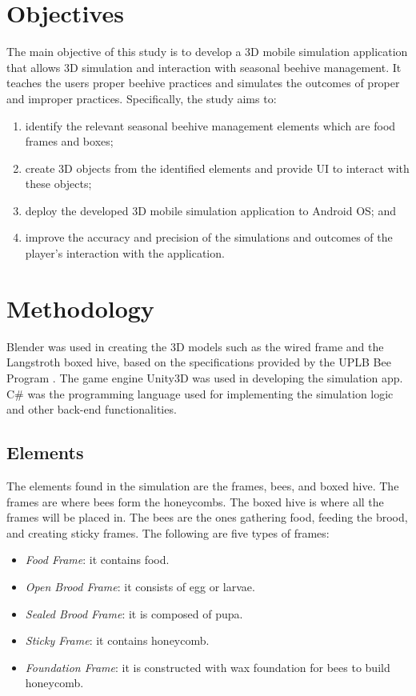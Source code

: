 \documentclass[journal]{./IEEE/IEEEtran}
\begin{document}
\section{Objectives}
The main objective of this study is to develop a 3D mobile simulation application that allows 3D simulation and interaction with seasonal beehive management. It teaches the users proper beehive practices and simulates the outcomes of proper and improper practices. Specifically, the study aims to:
\begin{enumerate}
    \item identify the relevant seasonal beehive management elements which are food frames and boxes;
    \item create 3D objects from the identified elements and provide UI to interact with these objects;
    \item deploy the developed 3D mobile simulation application to Android OS; and
    \item improve the accuracy and precision of the simulations and outcomes of the player{'}s interaction with the application.
\end{enumerate}

\section{Methodology}
\indent Blender was used in creating the 3D models such as the wired frame and the Langstroth boxed hive, based on the specifications provided by the UPLB Bee Program \cite{cervanciaetal}. The game engine Unity3D was used in developing the simulation app. C\# was the programming language used for implementing the simulation logic and other back-end functionalities.
\subsection{Elements}
\pubidadjcol
The elements found in the simulation are the frames, bees, and boxed hive. The frames are where bees form the honeycombs. The boxed hive is where all the frames will be placed in. The bees are the ones gathering food, feeding the brood, and creating sticky frames. The following are five types of frames:
\begin{itemize}
    \item \textit{Food Frame}: it contains food.
    \item \textit{Open Brood Frame}: it consists of egg or larvae.
    \item \textit{Sealed Brood Frame}: it is composed of pupa.
    \item \textit{Sticky Frame}: it contains honeycomb.
    \item \textit{Foundation Frame}: it is constructed with wax foundation for bees to build honeycomb.
\end{itemize}
\end{document}
